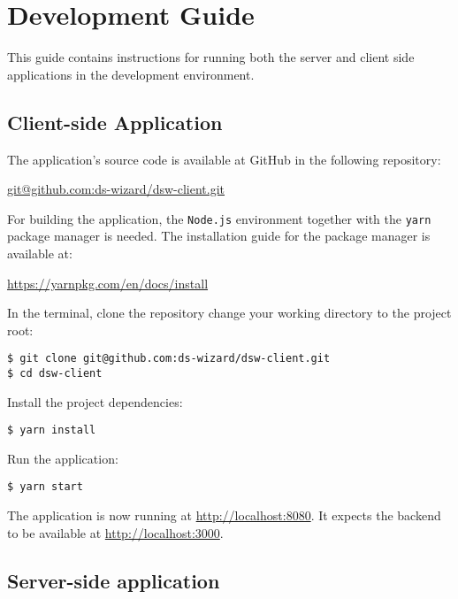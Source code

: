\chapter{Development Guide}

This guide contains instructions for running both the server and client side applications in the development environment.

\section{Client-side Application}

The application's source code is available at GitHub in the following repository:

\begin{center}
    \url{git@github.com:ds-wizard/dsw-client.git}
\end{center}

For building the application, the \texttt{Node.js} environment together with the \texttt{yarn} package manager is needed.
The installation guide for the package manager is available at:

\begin{center}
    \url{https://yarnpkg.com/en/docs/install}
\end{center}

In the terminal, clone the repository change your working directory to the project root:

\begin{verbatim}
$ git clone git@github.com:ds-wizard/dsw-client.git
$ cd dsw-client
\end{verbatim}

Install the project dependencies:

\begin{verbatim}
$ yarn install
\end{verbatim}

Run the application:

\begin{verbatim}
$ yarn start
\end{verbatim}


The application is now running at \url{http://localhost:8080}.
It expects the backend to be available at \url{http://localhost:3000}.

\section{Server-side application}

